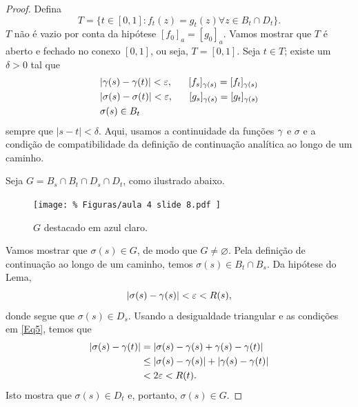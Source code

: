 \begin{proof}
        Defina
        \begin{equation*}
        T = \{t \in [0,1]: f_t(z) = g_t(z) \forall z \in B_t \cap D_t\}.
        \end{equation*}
        $T$ não é vazio por conta da hipótese $[f_0]_a = [g_0]_a$. Vamos mostrar que $T$ é
        aberto e fechado no conexo $[0,1]$, ou seja, $T = [0,1]$. Seja $t \in T$; 
        existe um $\delta > 0$ tal que
        \begin{align}
        \label{Eq5}
            &|\y(s) - \y(t)| < \e, \ \ \ \ \ [f_s]_{\y(s)} =
            [f_t]_{\y(s)} \\
            &|\sigma(s) - \sigma(t)| < \e, \ \ \ \ \ [g_s]_{\y(s)} =
            [g_t]_{\y(s)} \\
            &\sigma(s) \in B_t
        \end{align}
        sempre que $|s-t|<\delta$. Aqui, usamos a continuidade da funções $\gamma$ e $\sigma$ 
        e a condição de compatibilidade da definição de continuação analítica ao longo de um
        caminho.
        
        Seja $G = B_s \cap B_t \cap D_s \cap D_t$, como ilustrado abaixo. 
        \begin{figure}[H]\centering
            \texttt{[image: \%
                Figuras/aula 4 slide 8.pdf
            ]}
            \caption{%
                $G$ destacado em azul claro.
            }
        \end{figure}
        Vamos mostrar que 
        $\sigma(s) \in G$, de modo que $G \neq\varnothing$. Pela definição de continuação 
        ao longo de um caminho, temos $\sigma(s) \in B_t \cap B_s$. Da hipótese do Lema,
        \begin{equation*}
        |\sigma(s) - \gamma(s)| < \varepsilon < R(s),
        \end{equation*}
        donde segue que $\sigma(s) \in D_s$. Usando a desigualdade triangular e as condições em \ref{Eq5}, temos que
        \begin{align*}
        |\sigma(s) - \gamma(t)| &= |\sigma(s) - \gamma(s) + \gamma(s) - \gamma(t)| \\
        &\leq |\sigma(s) - \gamma(s)| + |\gamma(s) - \gamma(t)| \\
        &< 2\varepsilon < R(t).
        \end{align*}
        Isto mostra que $\sigma(s) \in D_t$ e, portanto, $\sigma(s) \in G$.
        

\end{proof}
